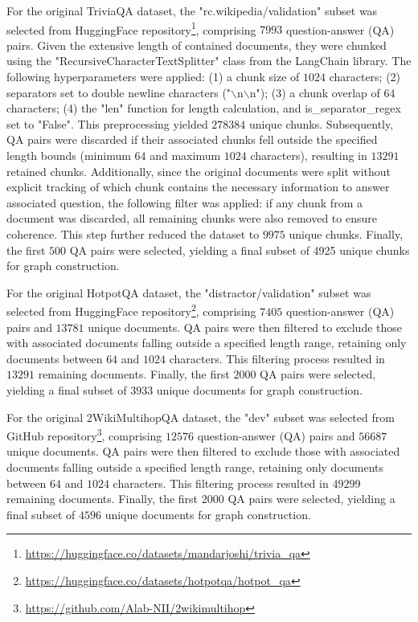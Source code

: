 For the original TriviaQA dataset, the "rc.wikipedia/validation" subset was selected from HuggingFace repository\footnote{\url{https://huggingface.co/datasets/mandarjoshi/trivia\_qa}}, comprising $7993$ question-answer (QA) pairs. Given the extensive length of contained documents, they were chunked using the "RecursiveCharacterTextSplitter" class from the LangChain library. The following hyperparameters were applied: (1) a chunk size of $1024$ characters; (2) separators set to double newline characters ("$\backslash$n$\backslash$n"); (3) a chunk overlap of $64$ characters; (4) the "len" function for length calculation, and is\_separator\_regex set to "False". This preprocessing yielded $278384$ unique chunks. Subsequently, QA pairs were discarded if their associated chunks fell outside the specified length bounds (minimum $64$ and maximum $1024$ characters), resulting in $13291$ retained chunks. Additionally, since the original documents were split without explicit tracking of which chunk contains the necessary information to answer associated question, the following filter was applied: if any chunk from a document was discarded, all remaining chunks were also removed to ensure coherence. This step further reduced the dataset to $9975$ unique chunks. Finally, the first $500$ QA pairs were selected, yielding a final subset of 4925 unique chunks for graph construction.

For the original HotpotQA dataset, the "distractor/validation" subset was selected from HuggingFace repository\footnote{\url{https://huggingface.co/datasets/hotpotqa/hotpot\_qa}}, comprising $7405$ question-answer (QA) pairs and $13781$ unique documents. QA pairs were then filtered to exclude those with associated documents falling outside a specified length range, retaining only documents between $64$ and $1024$ characters. This filtering process resulted in $13291$ remaining documents. Finally, the first $2000$ QA pairs were selected, yielding a final subset of $3933$ unique documents for graph construction.

For the original 2WikiMultihopQA dataset, the "dev" subset was selected from GitHub repository\footnote{\url{https://github.com/Alab-NII/2wikimultihop}}, comprising $12576$ question-answer (QA) pairs and $56687$ unique documents. QA pairs were then filtered to exclude those with associated documents falling outside a specified length range, retaining only documents between $64$ and $1024$ characters. This filtering process resulted in $49299$ remaining documents. Finally, the first $2000$ QA pairs were selected, yielding a final subset of $4596$ unique documents for graph construction.


